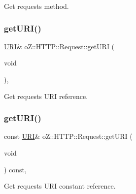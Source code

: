 Get request\textquotesingle{}s method. 

\mbox{\label{classo_z_1_1_h_t_t_p_1_1_request_aaec3f19cb4ee6a18878166049df3253a}} 
\subsubsection{\texorpdfstring{getURI()}{getURI()}\hspace{0.1cm}{\footnotesize\ttfamily [1/2]}}
{\footnotesize\ttfamily \mbox{\hyperlink{namespaceo_z_1_1_h_t_t_p_a6d47156e2eac27750983fc1b54bd2ff8}{U\+RI}}\& o\+Z\+::\+H\+T\+T\+P\+::\+Request\+::get\+U\+RI (\begin{DoxyParamCaption}\item[{void}]{ }\end{DoxyParamCaption})\hspace{0.3cm}{\ttfamily [inline]}, {\ttfamily [noexcept]}}



Get request\textquotesingle{}s U\+RI reference. 

\mbox{\label{classo_z_1_1_h_t_t_p_1_1_request_afe1db07c464e1b708187108cbef952fa}} 
\subsubsection{\texorpdfstring{getURI()}{getURI()}\hspace{0.1cm}{\footnotesize\ttfamily [2/2]}}
{\footnotesize\ttfamily const \mbox{\hyperlink{namespaceo_z_1_1_h_t_t_p_a6d47156e2eac27750983fc1b54bd2ff8}{U\+RI}}\& o\+Z\+::\+H\+T\+T\+P\+::\+Request\+::get\+U\+RI (\begin{DoxyParamCaption}\item[{void}]{ }\end{DoxyParamCaption}) const\hspace{0.3cm}{\ttfamily [inline]}, {\ttfamily [noexcept]}}



Get request\textquotesingle{}s U\+RI constant reference. 

\mbox{\label{classo_z_1_1_h_t_t_p_1_1_request_a9738725e912aad1cdf346b233c49654f}} 
